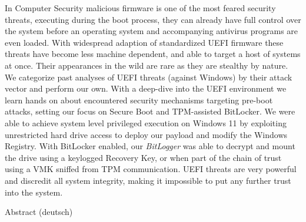 

\label{sec:abstract}
\thispagestyle{empty}


In Computer Security malicious firmware is one of the most feared security threats, executing during the boot process, they can already have full control over the system before an operating system and accompanying antivirus programs are even loaded.
With widespread adaption of standardized \acs{UEFI} firmware these threats have become less machine dependent, and able to target a host of systems at once.
Their appearances in the wild are rare as they are stealthy by nature. We categorize past analyses of UEFI threats (against Windows) by their attack vector and perform our own.
With a deep-dive into the UEFI environment we learn hands on about encountered security mechanisms targeting pre-boot attacks, setting our focus on Secure Boot and TPM-assisted BitLocker.
We were able to achieve system level privileged execution on Windows 11 by exploiting unrestricted hard drive access to deploy our payload and modify the Windows Registry. With BitLocker enabled, our \emph{BitLogger} was able to decrypt and mount the drive using a keylogged Recovery Key, or when part of the chain of trust using a VMK sniffed from TPM communication.
UEFI threats are very powerful and discredit all system integrity, making it impossible to put any further trust into the system.

\vspace*{20mm}

{Abstract (deutsch)}
\label{sec:abstract-diff}

\blindtext
